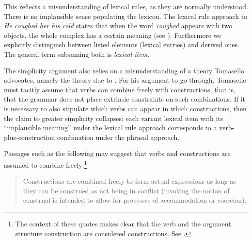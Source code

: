 \noindent
This reflects a misunderstanding of lexical rules, as they are normally understood.  There is no implausible sense populating the lexicon.
The lexical rule approach to \emph{He coughed her his cold} states that when the word \emph{coughed} appears with
two objects, the whole complex has a certain meaning (see \citealp[]{Mueller2006d}). Furthermore we explicitly distinguish between listed elements
(lexical entries) and derived ones. The general term subsuming both is \emph{lexical item}.


The simplicity argument also relies on a misunderstanding of a theory Tomasello advocates, namely the
theory due to \citet{Goldberg95a, Goldberg2006a}.  For his argument to go through, Tomasello must tacitly assume
that verbs can combine freely with constructions, that is, that the grammar does not place extrinsic
constraints on such combinations.  If it is necessary to also stipulate which verbs can appear in
which constructions, then the claim to greater simplicity collapses: each variant lexical item with
its ``implausible meaning'' under the lexical rule approach corresponds to a verb-plus-construction
combination under the phrasal approach. 

Passages such as the following may suggest that verbs and constructions are assumed to combine
freely:\footnote{The context of these quotes makes clear that the verb and the argument structure construction are considered 
constructions.  See \citet[, ex.~(2)]{Goldberg2006a}.} 


\begin{quote}
Constructions are combined freely to form actual expressions as long
as they can be construed as not being in conflict (invoking the notion
of construal is intended to allow for processes of accommodation or
coercion).  \citep[]{Goldberg2006a} 
\end{quote}

